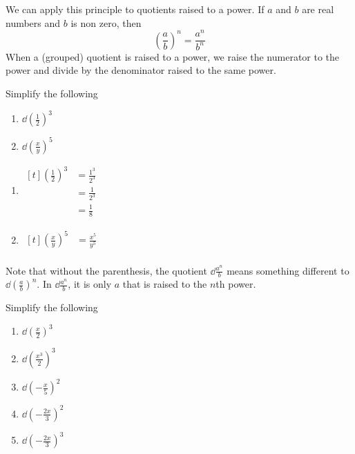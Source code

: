 We can apply this principle to quotients raised to a power. If $a$ and $b$ are real numbers
and $b$ is non zero, then
\[
	\left( \frac{a}{b}\right)^n = \frac{a^n}{b^n}
\]
When a (grouped) quotient is raised to a power, we raise the numerator to the power and 
divide by the denominator raised to the same power.

\begin{myexample}
Simplify the following
\begin{multicols}{2}
	\begin{enumerate}
		\item $\dd\left(\frac{1}{2}\right)^3$
		\item $\dd\left(\frac{x}{y}\right)^5$
	\end{enumerate} 
\end{multicols}
\end{myexample}
\begin{myProof}
	\begin{enumerate}
		\item 
		$\begin{aligned}[t]
			\left(\frac{1}{2}\right)^3 & =		\frac{1^3}{2^3} \\
			                           & =		\frac{1}{2^3}   \\
			                           & =		\frac{1}{8}     
		\end{aligned}	$
		\item 
		$\begin{aligned}[t]
			\left(\frac{x}{y}\right)^5 & =		\frac{x^5}{y^5} \\
		\end{aligned}$
	\end{enumerate} 
\end{myProof} 
Note that without the parenthesis, the quotient $\dd\frac{a^n}{b}$ means something different to $\dd\left(\frac{a}{b}\right)^n$. In
$\dd\frac{a^n}{b}$, it is only $a$ that is raised to the $n$th power.

\begin{myexample}
Simplify the following
\drillandskill
\end{myexample}
\begin{multicols}{2}
	\begin{enumerate}
		\item $\dd\left(\frac{x}{2}\right)^3$
		\item $\dd\left(\frac{x^3}{2}\right)^3$
		\item $\dd\left(-\frac{x}{5}\right)^2$
		\item $\dd\left(-\frac{2x}{3}\right)^2$
		\item $\dd\left(-\frac{2x}{3}\right)^3$
	\end{enumerate}
\end{multicols}

